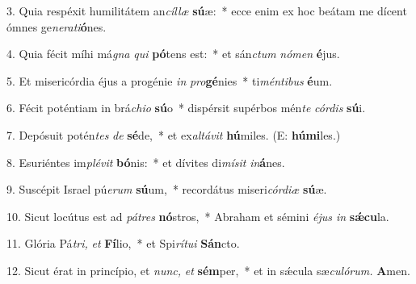 \item 3. Quia respéxit humilitátem an\textit{cíllæ} \textbf{sú}æ:~* ecce enim ex hoc beátam me dícent ómnes ge\textit{nerati}\textbf{ó}nes.

\item 4. Quia fécit míhi má\textit{gna} \textit{qui} \textbf{pó}tens est:~* et sán\textit{ctum} \textit{nómen} \textbf{é}jus.

\item 5. Et misericórdia éjus a progénie \textit{in} \textit{pro}\textbf{gé}nies~* ti\textit{méntibus} \textbf{é}um.

\item 6. Fécit poténtiam in brá\textit{chi}\textit{o} \textbf{sú}o~* dispérsit supérbos mén\textit{te} \textit{cór}\textit{dis} \textbf{sú}i.

\item 7. Depósuit potén\textit{tes} \textit{de} \textbf{sé}de,~* et ex\textit{altávit} \textbf{hú}miles. (E: \textbf{húmi}les.)

\item 8. Esuriéntes im\textit{plé}\textit{vit} \textbf{bó}nis:~* et dívites di\textit{mísit} \textit{in}\textbf{á}nes.

\item 9. Suscépit Israel pú\textit{erum} \textbf{sú}um,~* recordátus miseri\textit{córdiæ} \textbf{sú}æ.

\item 10. Sicut locútus est ad \textit{pátres} \textbf{nó}stros,~* Abraham et sémini \textit{éjus in} \textbf{sǽcu}la.

\item 11. Glória Pá\textit{tri,} \textit{et} \textbf{Fí}lio,~* et Spi\textit{rítui} \textbf{Sán}cto.

\item 12. Sicut érat in princípio, et \textit{nunc,} \textit{et} \textbf{sém}per,~* et in sǽcula sæ\textit{culórum.} \textbf{A}men.